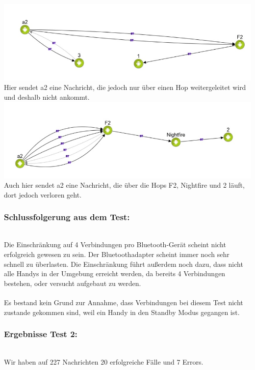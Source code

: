\includegraphics[width=1.0\textwidth]{belege/grosstests/Bilder/Grosstest2/Test1Misserfolg1.jpg}\\
Hier sendet a2 eine Nachricht, die jedoch nur über einen Hop
weitergeleitet wird und deshalb nicht ankommt.\\
\includegraphics[width=1.0\textwidth]{belege/grosstests/Bilder/Grosstest2/Test1Misserfolg3.jpg}\\
Auch hier sendet a2 eine Nachricht, die über die Hops F2, Nightfire und
2 läuft, dort jedoch verloren geht.\\

\subsubsection{Schlussfolgerung aus dem
Test:}\label{schlussfolgerung-aus-dem-test-2}\\

Die Einschränkung auf 4 Verbindungen pro Bluetooth-Gerät scheint nicht
erfolgreich gewesen zu sein. Der Bluetoothadapter scheint immer noch
sehr schnell zu überlasten. Die Einschränkung führt außerdem noch dazu,
dass nicht alle Handys in der Umgebung erreicht werden, da bereits 4
Verbindungen bestehen, oder versucht aufgebaut zu werden.\\\\

Es bestand kein Grund zur Annahme, dass Verbindungen bei diesem Test
nicht zustande gekommen sind, weil ein Handy in den Standby Modus
gegangen ist.
\\
\subsubsection{Ergebnisse Test 2:}\label{ergebnisse-test-2-1}
\\
Wir haben auf 227 Nachrichten 20 erfolgreiche Fälle und 7 Errors.\\\\

